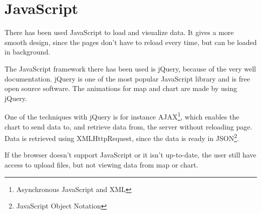 \chapter{JavaScript}
There has been used JavaScript to load and visualize data. It gives a more smooth design, since the pages don't have to reload every time, but can be loaded in background.

The JavaScript framework there has been used is jQuery, because of the very well documentation. jQuery is one of the most popular JavaScript library and is free open source software. The animations for map and chart are made by using jQuery.
 
One of the techniques with jQuery is for instance AJAX\footnote{Asynchronous JavaScript and XML}, which enables the chart to send data to, and retrieve data from, the server without reloading page. Data is retrieved using XMLHttpRequest, since the data is ready in JSON\footnote{JavaScript Object Notation}.

If the browser doesn't support JavaScript or it isn't up-to-date, the user still have access to upload files, but not viewing data from map or chart.